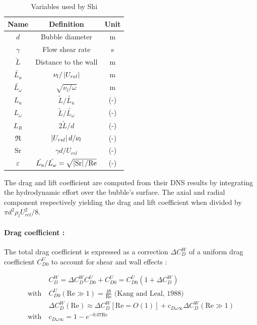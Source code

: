 \begin{table}[h!]
\centering
\begin{tabular}{|c|c|c|}
\hline
Name & Definition & Unit\\
\hline
\hline

$d$ & Bubble diameter & m\\
\hline
$\gamma$ & Flow shear rate & s\up{-1}\\
\hline
$\tilde{L}$& Distance to the wall & m\\
\hline
$\tilde{L_{u}}$ & $\nu_{l}/\left| U_{rel} \right|$ & m\\ 
\hline
$\tilde{L_{\omega}}$ & $\sqrt{\nu_{l}/\omega}$ & m\\
\hline
\hline
$L_{u}$ & $\tilde{L}/\tilde{L_{u}}$ & (-)\\
\hline
$L_{\omega}$ & $\tilde{L}/\tilde{L_{\omega}}$ & (-)\\
\hline
$L_{R}$ & $2\tilde{L}/d$ & (-)\\
\hline
$\Re$ & $\left| U_{rel} \right|d/\nu_{l}$ & (-)\\
\hline
$\mathrm{Sr}$ & $\gamma d / U_{rel}$ & (-)\\
\hline
$\varepsilon$ & $\tilde{L_{u}}/\tilde{L_{\omega}}=\sqrt{\left| \mathrm{Sr} \right|/\mathrm{Re}}$ & (-)\\
\hline
\end{tabular}
\caption{Variables used by Shi \etal}
\label{tab:var_shi}
\end{table}


The drag and lift coefficient are computed from their DNS results by integrating the hydrodynamic effort over the bubble's surface. The axial and radial component respectively yielding the drag and lift coefficient when divided by $\pi d^{2}\rho_{l}U_{rel}^{2}/8$.

\npar

\paragraph{Drag coefficient :}

The total drag coefficient is expressed as a correction $\Delta C_{D}^{W}$ of a uniform drag coefficient $C_{D0}^{U}$ to account for shear and wall effects :


\begin{align}
&C_{D}^{W}=\Delta C_{D}^{W} C_{D0}^{U} + C_{D0}^{U} = C_{D0}^{U} \left( 1 + \Delta C_{D}^{W}\right)\\
\text{with}\  &C_{D0}^{U}\left(\text{Re} \gg 1 \right) = \frac{48}{\text{Re}} \text{ (Kang and Leal, 1988)}\\
&\Delta C_{D}^{W} \left(\text{Re}\right) \approx \Delta C_{D}^{W}\left[\text{Re}=O(1)\right] + c_{D\omega\infty}\Delta C_{D}^{W}\left(\text{Re}\gg1\right)\\
\text{with}\  &c_{D\omega\infty}=1-e^{-0.07\text{Re}}
\end{align}

